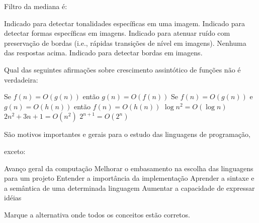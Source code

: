 \documentclass[12pt, addpoints]{exam}
\begin{document}
\begin{questions}
\question

Filtro da mediana é:
\begin{choices}
\choice Indicado para detectar tonalidades específicas em uma imagem.
\choice Indicado para detectar formas específicas em imagens.
\choice Indicado para atenuar ruído com preservação de bordas (i.e., rápidas transições de nível em imagens).
\choice Nenhuma das respostas acima.
\choice Indicado para detectar bordas em imagens.
\end{choices}

\question

Qual das seguintes afirmações sobre crescimento assintótico de funções não é verdadeira:
\begin{choices}
\choice Se \( f(n) = O(g(n)) \) então \( g(n) = O(f(n)) \)
\choice Se \( f(n) = O(g(n)) \) e \( g(n) = O(h(n)) \) então \( f(n) = O(h(n)) \)
\choice \( \log n^2 = O(\log n) \)
\choice \( 2n^2 + 3n + 1 = O(n^2) \)
\choice \( 2^{n+1} = O(2^n) \)
\end{choices}

\question

São motivos importantes e gerais para o estudo das linguagens de programação,

exceto:
\begin{choices}
\choice Avanço geral da computação
\choice Melhorar o embasamento na escolha das linguagens para um projeto
\choice Entender a importância da implementação
\choice Aprender a sintaxe e a semântica de uma determinada linguagem
\choice Aumentar a capacidade de expressar idéias
\end{choices}

\question

Marque a alternativa onde todos os conceitos estão corretos.



\end{questions}
\end{document}
